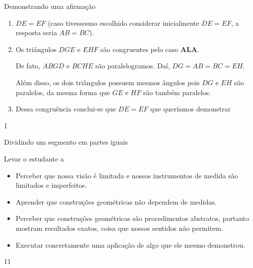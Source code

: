 \begin{answer}{Demonstrando uma afirmação}
{
\begin{enumerate}
\item {} 
\(DE = EF\) (caso tivessesmo escolhido considerar inicialmente \(DE=EF\), a resposta seria \(AB=BC\)).

\item {} 
Os triângulos \(DGE\) e \(EHF\) são congruentes pelo caso \textbf{ALA}.

De fato, \(ABGD\) e \(BCHE\) são paralelogramos. Daí, \(DG = AB = BC = EH\).

Além disso, os dois triângulos possuem mesmos ângulos pois \(DG\) e \(EH\) são paralelos, da mesma forma que \(GE\) e \(HF\) são também paralelos.

\item {} 
Dessa congruência conclui-se que \(DE = EF\) que queríamos demonstrar

\end{enumerate}
}{1}
\end{answer}
\clearmargin
\def\currentcolor{session2}
\begin{objectives}{Dividindo um segmento em partes iguais}
{
Levar o estudante a
\begin{itemize}
\item {} 
Perceber que nossa visão é limitada e nossos instrumentos de medida são limitados e imperfeitos.

\item {} 
Aprender que construções geométricas não dependem de medidas.

\item {} 
Perceber que construções geométricas são procedimentos abstratos, portanto mostram resultados exatos, coisa que nossos sentidos não permitem.

\item {} 
Executar concretamente uma aplicação de algo que ele mesmo demonstrou.

\end{itemize}
}{1}{1}
\end{objectives}
